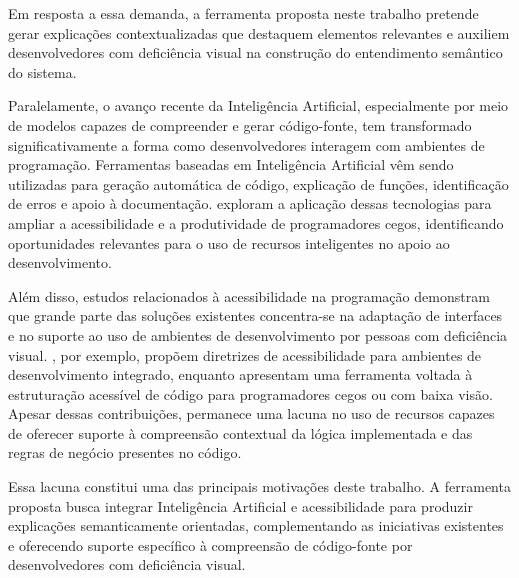 \documentclass[
    12pt,                   %
    openright,              %
    oneside,                %
    a4paper,                %
    sumario=tradicional,    %
    english,                %
    brazil,                 %
    ]{abntex2}
\begin{document}
Em resposta a essa demanda, a ferramenta proposta neste trabalho pretende gerar explicações contextualizadas que destaquem elementos relevantes e auxiliem desenvolvedores com deficiência visual na construção do entendimento semântico do sistema.

Paralelamente, o avanço recente da Inteligência Artificial, especialmente por meio de modelos capazes de compreender e gerar código-fonte, tem transformado significativamente a forma como desenvolvedores interagem com ambientes de programação. Ferramentas baseadas em Inteligência Artificial vêm sendo utilizadas para geração automática de código, explicação de funções, identificação de erros e apoio à documentação. \textcite{latinoware34224} exploram a aplicação dessas tecnologias para ampliar a acessibilidade e a produtividade de programadores cegos, identificando oportunidades relevantes para o uso de recursos inteligentes no apoio ao desenvolvimento.

Além disso, estudos relacionados à acessibilidade na programação demonstram que grande parte das soluções existentes concentra-se na adaptação de interfaces e no suporte ao uso de ambientes de desenvolvimento por pessoas com deficiência visual. \textcite{latinoware37693}, por exemplo, propõem diretrizes de acessibilidade para ambientes de desenvolvimento integrado, enquanto \textcite{latinoware40920} apresentam uma ferramenta voltada à estruturação acessível de código para programadores cegos ou com baixa visão. Apesar dessas contribuições, permanece uma lacuna no uso de recursos capazes de oferecer suporte à compreensão contextual da lógica implementada e das regras de negócio presentes no código.

Essa lacuna constitui uma das principais motivações deste trabalho. A ferramenta proposta busca integrar Inteligência Artificial e acessibilidade para produzir explicações semanticamente orientadas, complementando as iniciativas existentes e oferecendo suporte específico à compreensão de código-fonte por desenvolvedores com deficiência visual.
\end{document}
